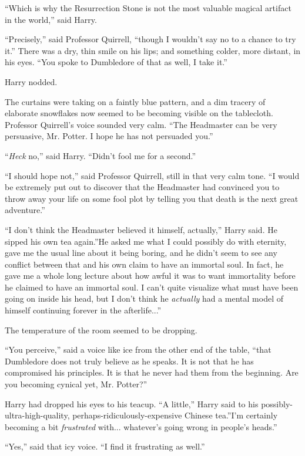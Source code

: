 ``Which is why the Resurrection Stone is not the most valuable magical
artifact in the world,'' said Harry.

``Precisely,'' said Professor Quirrell, ``though I wouldn't say no to a
chance to try it.'' There was a dry, thin smile on his lips; and
something colder, more distant, in his eyes. ``You spoke to Dumbledore
of that as well, I take it.''

Harry nodded.

The curtains were taking on a faintly blue pattern, and a dim tracery of
elaborate snowflakes now seemed to be becoming visible on the
tablecloth. Professor Quirrell's voice sounded very calm. ``The
Headmaster can be very persuasive, Mr. Potter. I hope he has not
persuaded you.''

``\emph{Heck} no,'' said Harry. ``Didn't fool me for a second.''

``I should hope not,'' said Professor Quirrell, still in that very calm
tone. ``I would be extremely put out to discover that the Headmaster had
convinced you to throw away your life on some fool plot by telling you
that death is the next great adventure.''

``I don't think the Headmaster believed it himself, actually,'' Harry
said. He sipped his own tea again.''He asked me what I could possibly do
with eternity, gave me the usual line about it being boring, and he
didn't seem to see any conflict between that and his own claim to have
an immortal soul. In fact, he gave me a whole long lecture about how
awful it was to want immortality before he claimed to have an immortal
soul. I can't quite visualize what must have been going on inside his
head, but I don't think he \emph{actually} had a mental model of himself
continuing forever in the afterlife...''

The temperature of the room seemed to be dropping.

``You perceive,'' said a voice like ice from the other end of the table,
``that Dumbledore does not truly believe as he speaks. It is not that he
has compromised his principles. It is that he never had them from the
beginning. Are you becoming cynical yet, Mr. Potter?''

Harry had dropped his eyes to his teacup. ``A little,'' Harry said to
his possibly-ultra-high-quality, perhaps-ridiculously-expensive Chinese
tea.''I'm certainly becoming a bit \emph{frustrated} with...
whatever's going wrong in people's heads.''

``Yes,'' said that icy voice. ``I find it frustrating as well.''

